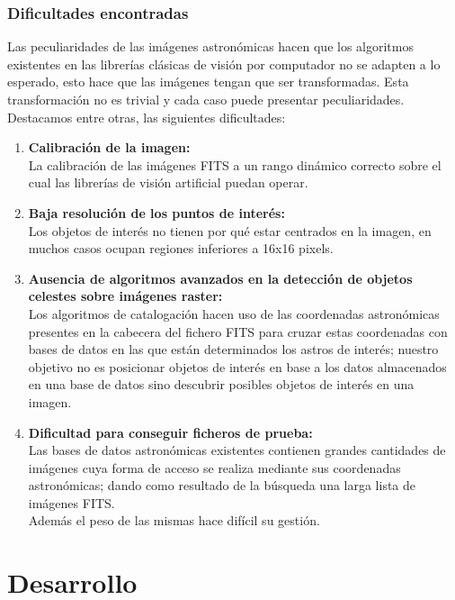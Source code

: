 	\subsubsection{Dificultades encontradas}
	Las peculiaridades de las imágenes astronómicas hacen que los algoritmos existentes en las librerías clásicas de visión por computador no se adapten a lo esperado, esto hace que las imágenes tengan que ser transformadas. Esta transformación no es trivial y cada caso puede presentar peculiaridades.
	\newline
	\\
	Destacamos entre otras, las siguientes dificultades:
	\begin{enumerate}
	\item \textbf{Calibración de la imagen:}\\
	La calibración de las imágenes FITS a un rango dinámico correcto sobre el cual las librerías de visión artificial puedan operar.
	\item \textbf{Baja resolución de los puntos de interés:}\\
	Los objetos de interés no tienen por qué estar centrados en la imagen, en muchos casos ocupan regiones inferiores a 16x16 pixels. 
	\item \textbf{Ausencia de algoritmos avanzados en la detección de objetos celestes sobre imágenes raster:}\\
	Los algoritmos de catalogación hacen uso de las coordenadas astronómicas presentes en la cabecera del fichero FITS para cruzar estas coordenadas con bases de datos en las que están determinados los astros de interés; nuestro objetivo no es posicionar objetos de interés en base a los datos almacenados en una base de datos sino descubrir posibles objetos de interés en una imagen.
	\item \textbf{Dificultad para conseguir ficheros de prueba:} \\
	Las bases de datos astronómicas existentes contienen grandes cantidades de imágenes cuya forma de acceso se realiza mediante sus coordenadas astronómicas; dando como resultado de la búsqueda una larga lista de imágenes FITS.\\Además el peso de las mismas hace difícil su gestión.
	\end{enumerate}

	\section{Desarrollo}
